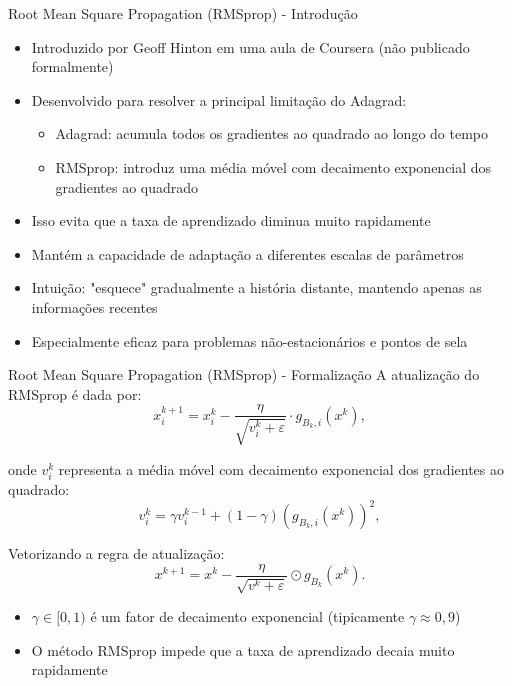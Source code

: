 \documentclass[aspectratio=1610]{beamer}
\begin{document}
\begin{frame}{Root Mean Square Propagation (RMSprop) - Introdução}
\begin{itemize}
    \item Introduzido por Geoff Hinton em uma aula de Coursera (não publicado formalmente)
    \item Desenvolvido para resolver a principal limitação do Adagrad:
    \begin{itemize}
        \item Adagrad: acumula todos os gradientes ao quadrado ao longo do tempo
        \item RMSprop: introduz uma média móvel com decaimento exponencial dos gradientes ao quadrado
    \end{itemize}
    \item Isso evita que a taxa de aprendizado diminua muito rapidamente
    \item Mantém a capacidade de adaptação a diferentes escalas de parâmetros
    \item Intuição: "esquece" gradualmente a história distante, mantendo apenas as informações recentes
    \item Especialmente eficaz para problemas não-estacionários e pontos de sela
\end{itemize}
\end{frame}

\begin{frame}{Root Mean Square Propagation (RMSprop) - Formalização}
A atualização do RMSprop é dada por:
\begin{equation}
x_i^{k+1} = x_i^{k} - \frac{\eta}{\sqrt{v_i^{k} + \varepsilon}} \cdot g_{B_{k},i}(x^k),
\end{equation}

onde $v_i^k$ representa a média móvel com decaimento exponencial dos gradientes ao quadrado:
\begin{equation}
v_i^k = \gamma v_i^{k-1} + (1 - \gamma)(g_{B_{k},i}(x^k))^2,
\end{equation}

Vetorizando a regra de atualização:
\begin{equation}
x^{k+1} = x^k - \frac{\eta}{\sqrt{v^k + \varepsilon}} \odot g_{B_k}(x^k).
\end{equation}

\begin{itemize}
    \item $\gamma \in [0,1)$ é um fator de decaimento exponencial (tipicamente $\gamma \approx 0,9$)
    \item O método RMSprop impede que a taxa de aprendizado decaia muito rapidamente
\end{itemize}
\end{frame}
\end{document}
